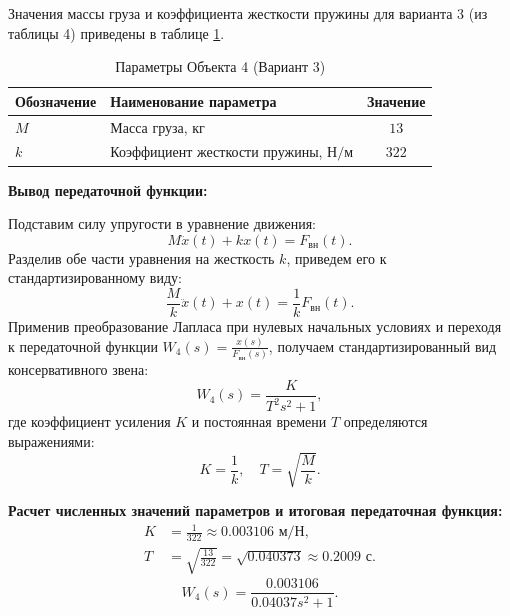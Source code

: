 \documentclass[12pt, a4paper]{article}
\begin{document}
Значения массы груза и коэффициента жесткости пружины для варианта 3 (из таблицы 4) приведены в таблице \ref{tab:obj4_params}.

\begin{table}[H]
\centering
\caption{Параметры Объекта 4 (Вариант 3)}
\label{tab:obj4_params}
\setlength{\tabcolsep}{10pt} 
\renewcommand{\arraystretch}{1.3} 
\begin{tabular}{@{} >{\raggedright\arraybackslash}p{3.5cm} >{\raggedright\arraybackslash}p{7.5cm} c @{}}
\toprule
\textbf{Обозначение} & \textbf{Наименование параметра} & \textbf{Значение} \\ \midrule
$M$ & Масса груза, $\text{кг}$ & $13$ \\
$k$ & Коэффициент жесткости пружины, $\text{Н/м}$ & $322$ \\ \bottomrule
\end{tabular}
\end{table}

\textbf{Вывод передаточной функции:}

Подставим силу упругости в уравнение движения:
\begin{equation*}
    M\ddot{x}(t) + kx(t) = F_{\text{вн}}(t).
\end{equation*}
Разделив обе части уравнения на жесткость $k$, приведем его к стандартизированному виду:
\begin{equation*}
    \frac{M}{k}\ddot{x}(t) + x(t) = \frac{1}{k}F_{\text{вн}}(t).
\end{equation*}
Применив преобразование Лапласа при нулевых начальных условиях и переходя к передаточной функции $W_4(s) = \frac{x(s)}{F_{\text{вн}}(s)}$, получаем стандартизированный вид консервативного звена:
\begin{equation}
    W_4(s) = \frac{K}{T^2s^2 + 1},
\end{equation}
где коэффициент усиления $K$ и постоянная времени $T$ определяются выражениями:
\begin{equation*}
    K = \frac{1}{k}, \quad T = \sqrt{\frac{M}{k}}.
\end{equation*}

\textbf{Расчет численных значений параметров и итоговая передаточная функция:}
\begin{align*}
    K &= \frac{1}{322} \approx 0.003106 \text{ м/Н}, \\
    T &= \sqrt{\frac{13}{322}} = \sqrt{0.040373} \approx 0.2009 \text{ с}.
\end{align*}
\begin{equation}
    W_4(s) = \frac{0.003106}{0.04037s^2 + 1}.
\end{equation}
\end{document}
